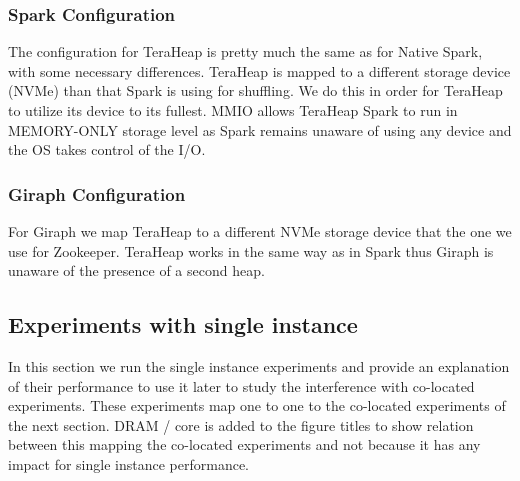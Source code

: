 \subsubsection{Spark Configuration}
The configuration for TeraHeap is pretty much the same as for Native
Spark, with some necessary differences. TeraHeap
is mapped to a different storage device (NVMe) than that Spark is
using for shuffling. We do this in order for TeraHeap to utilize its
device to its fullest. MMIO allows TeraHeap Spark to run in
MEMORY-ONLY storage level as Spark remains unaware of using any device and
the OS takes control of the I/O.

\subsubsection{Giraph Configuration}
For Giraph we map TeraHeap to a different NVMe storage device that the one we
use for Zookeeper. TeraHeap works in the same way as in Spark
thus Giraph is unaware of the presence of a second heap.

\subsection{Experiments with single instance}

In this section we run the single instance experiments and provide an explanation of their performance to use it later to study the interference with co-located experiments.
These experiments map one to one to the co-located experiments of the next section.
DRAM / core is added to the figure titles to show relation between this mapping the co-located experiments and not because it has any impact
for single instance performance.

